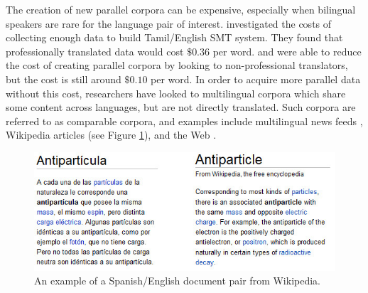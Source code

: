 The creation of new parallel corpora can be expensive, especially when bilingual
speakers are rare for the language pair of interest. \citet{Germann01a}
investigated the costs of collecting enough data to build Tamil/English SMT
system. They found that professionally translated data would cost $\$0.36$ per
word. \citet{Germann01a} and  \citep{Zaidan11} were able to reduce the
cost of creating parallel corpora by looking to non-professional translators,
but the cost is still around $\$0.10$ per word.
In order to acquire more parallel data without this cost,
researchers have looked to multilingual corpora which share some content across languages,
but are not directly translated. Such corpora are referred to as comparable
corpora, and examples include multilingual news feeds \citep{Munteanu05},
Wikipedia articles \citep{Adafre06,Smith10} (see Figure \ref{fig:wiki}), and the Web
\citep{Resnik99,Nie99,Chen00}. 

\begin{figure}[ht]
\includegraphics[width=\textwidth]{images/wiki.jpg}
\caption{An example of a Spanish/English document pair from Wikipedia.
}
\label{fig:wiki}
\end{figure}

